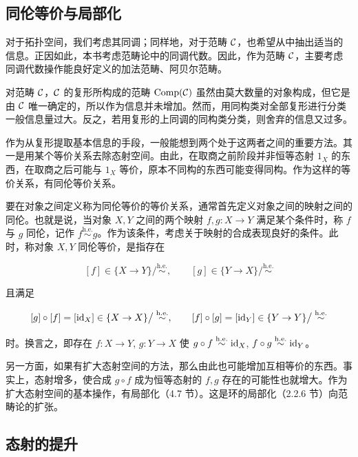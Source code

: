 \subsection{同伦等价与局部化}

对于拓扑空间，我们考虑其同调；同样地，对于范畴 $\mathcal{C}$，也希望从中抽出适当的信息。正因如此，本书考虑范畴论中的同调代数。因此，作为范畴 $\mathcal{C}$，主要考虑同调代数操作能良好定义的加法范畴、阿贝尔范畴。

对范畴 $\mathcal{C}$，$\mathcal{C}$ 的复形所构成的范畴 $\operatorname{Comp}(\mathcal{C})$ 虽然由莫大数量的对象构成，但它是由 $\mathcal{C}$ 唯一确定的，所以作为信息并未增加。然而，用同构类对全部复形进行分类一般信息量过大。反之，若用复形的上同调的同构类分类，则舍弃的信息又过多。

作为从复形提取基本信息的手段，一般能想到两个处于这两者之间的重要方法。其一是用某个等价关系去除态射空间。由此，在取商之前阶段并非恒等态射 $1_X$ 的东西，在取商之后可能与 $1_X$ 等价，原本不同构的东西可能变得同构。作为这样的等价关系，有同伦等价关系。

要在对象之间定义称为同伦等价的等价关系，通常首先定义对象之间的映射之间的同伦。也就是说，当对象 $X,Y$ 之间的两个映射 $f,g : X\to Y$ 满足某个条件时，称 $f$ 与 $g$ 同伦，记作 $f\overset{\mathrm{h.e.}}{\sim}g$。作为该条件，考虑关于映射的合成表现良好的条件。此时，称对象 $X,Y$ 同伦等价，是指存在

\[[f]\in\{X\to Y\}\big/\overset{\mathrm{h.e.}}{\sim},\qquad [g]\in\{Y\to X\}\big/\overset{\mathrm{h.e.}}{\sim}\]

且满足

\[[g]\circ[f]=[\mathrm{id}_X]\in\{X\to X\}\big/\overset{\mathrm{h.e.}}{\sim},\qquad [f]\circ[g]=[\mathrm{id}_Y]\in\{Y\to Y\}\big/\overset{\mathrm{h.e.}}{\sim}\]

时。换言之，即存在 $f : X\to Y$, $g : Y\to X$ 使 $g\circ f\overset{\mathrm{h.e.}}{\sim}\mathrm{id}_X$, $f\circ g\overset{\mathrm{h.e.}}{\sim}\mathrm{id}_Y$。


另一方面，如果有扩大态射空间的方法，那么由此也可能增加互相等价的东西。事实上，态射增多，使合成 $g\circ f$ 成为恒等态射的 $f,g$ 存在的可能性也就增大。作为扩大态射空间的基本操作，有局部化（4.7 节）。这是环的局部化（2.2.6 节）向范畴论的扩张。

\subsection{态射的提升}

